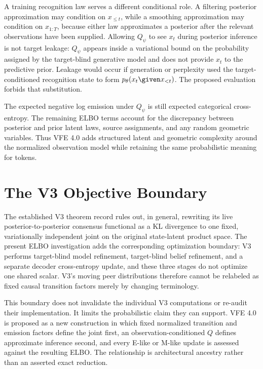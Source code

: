 A training recognition law serves a different conditional role. A filtering posterior approximation may condition on $x_{\leq t}$, while a smoothing approximation may condition on $x_{1:T}$, because either law approximates a posterior after the relevant observations have been supplied. Allowing $Q_\psi$ to see $x_t$ during posterior inference is not target leakage: $Q_\psi$ appears inside a variational bound on the probability assigned by the target-blind generative model and does not provide $x_t$ to the predictive prior. Leakage would occur if generation or perplexity used the target-conditioned recognition state to form $p_\theta(x_t\given x_{<t})$. The proposed evaluation forbids that substitution.

The expected negative log emission under $Q_\psi$ is still expected categorical cross-entropy. The remaining ELBO terms account for the discrepancy between posterior and prior latent laws, source assignments, and any random geometric variables. Thus VFE 4.0 adds structured latent and geometric complexity around the normalized observation model while retaining the same probabilistic meaning for tokens.

\section{The V3 Objective Boundary}

The established V3 theorem record rules out, in general, rewriting its live posterior-to-posterior consensus functional as a KL divergence to one fixed, variationally independent joint on the original state-latent product space. The present ELBO investigation adds the corresponding optimization boundary: V3 performs target-blind model refinement, target-blind belief refinement, and a separate decoder cross-entropy update, and these three stages do not optimize one shared scalar. V3's moving peer distributions therefore cannot be relabeled as fixed causal transition factors merely by changing terminology.

This boundary does not invalidate the individual V3 computations or re-audit their implementation. It limits the probabilistic claim they can support. VFE 4.0 is proposed as a new construction in which fixed normalized transition and emission factors define the joint first, an observation-conditioned $Q$ defines approximate inference second, and every E-like or M-like update is assessed against the resulting ELBO. The relationship is architectural ancestry rather than an asserted exact reduction.

